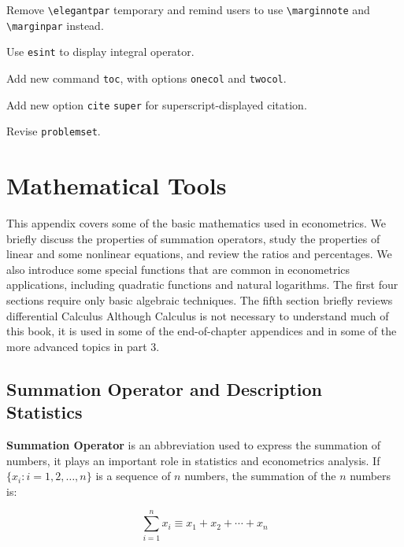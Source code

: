 \documentclass[11pt]{elegantbook}
\begin{document}
\begin{change}
  \item Remove \lstinline{\elegantpar} temporary and remind users to use \lstinline{\marginnote} and \lstinline{\marginpar} instead.
  \item Use \lstinline{esint} to display integral operator.
  \item Add new command \lstinline{toc}, with options  \lstinline{onecol} and \lstinline{twocol}.
  \item Add new option \lstinline{cite} \lstinline{super} for superscript-displayed citation.
  \item Revise \lstinline{problemset}.
\end{change}


\nocite{en2,en3}

\printbibliography[heading=bibintoc, title=\ebibname]
\appendix


\chapter{Mathematical Tools}

This appendix covers some of the basic mathematics used in econometrics. We briefly discuss the properties of summation operators, study the properties of linear and some nonlinear equations, and review the ratios and percentages. We also introduce some special functions that are common in econometrics applications, including quadratic functions and natural logarithms. The first four sections require only basic algebraic techniques. The fifth section briefly reviews differential Calculus Although Calculus is not necessary to understand much of this book, it is used in some of the end-of-chapter appendices and in some of the more advanced topics in part 3.

\section{Summation Operator and Description Statistics}

\textbf{Summation Operator} is an abbreviation used to express the summation of numbers, it plays an important role in statistics and econometrics analysis. If $\{x_i: i=1, 2, \ldots, n\}$ is a sequence of $n$ numbers, the summation of the $n$ numbers is:

\begin{equation}
\sum_{i=1}^n x_i \equiv x_1 + x_2 +\cdots + x_n
\end{equation}
\end{document}
